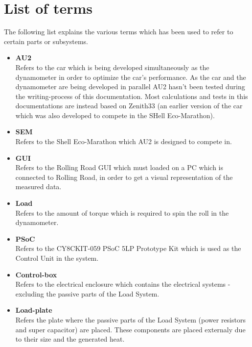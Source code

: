 \section{List of terms}
The following list explains the various terms which has been used to refer to certain parts or subsystems.
\begin{itemize}
	\item \textbf{AU2}\\
	Refers to the car which is being developed simultaneously as the dynamometer in order to optimize the car's performance. As the car and the dynamometer are being developed in parallel AU2 hasn't been tested during the writing-process of this documentation. Most calculations and tests in this documentations are instead based on Zenith33 (an earlier version of the car which was also developed to compete in the SHell Eco-Marathon).
	\item \textbf{SEM}\\
	Refers to the Shell Eco-Marathon which AU2 is designed to compete in.
	\item \textbf{GUI}\\
	Refers to the Rolling Road GUI which must loaded on a PC which is connected to Rolling Road, in order to get a visual representation of the measured data.
	\item \textbf{Load}\\
	Refers to the amount of torque which is required to spin the roll in the dynamometer.
	\item \textbf{PSoC}\\
	Refers to the CY8CKIT-059 PSoC 5LP Prototype Kit which is used as the Control Unit in the system.
	\item \textbf{Control-box}\\
	Refers to the electrical enclosure which contains the electrical systems - excluding the passive parts of the Load System. 
	\item \textbf{Load-plate}\\
	Refers the plate where the passive parts of the Load System (power resistors and super capacitor) are placed. These components are placed externaly due to their size and the generated heat.
\end{itemize}